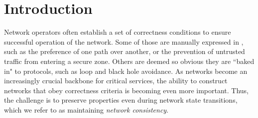 \section{Introduction}
\label{sec:intro}



Network operators often establish a set of correctness conditions to ensure 
successful operation of the network.
Some of those are manually expressed in , such as
the preference of one path over another, or the prevention of untrusted traffic
from entering a secure zone. Others are deemed so obvious they are ``baked in"
to protocols, such as loop
and black hole avoidance. As networks become an increasingly crucial backbone for
critical services,
the ability to construct networks that obey correctness criteria is becoming
even more important. 
Thus, the challenge is to preserve properties even during
network state transitions, which we refer to as maintaining {\em network consistency}. 

